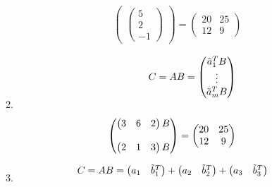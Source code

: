 \documentclass[12pt]{article}
\begin{document}
\begin{enumerate}
\begin{enumerate}
\begin{align*}
\begin{pmatrix}
\begin{pmatrix}
                    5 \\
                    2 \\
                    -1
                \end{pmatrix}
            \end{pmatrix}
            = \begin{pmatrix}
                20 & 25 \\
                12 & 9
            \end{pmatrix}
        \end{align*}
        \item 
        \begin{align*}
            C = AB = \begin{pmatrix}
                \Tilde{a}_1^T B \\
                \vdots \\
                \Tilde{a}_m^T B
            \end{pmatrix} && \\ && \\
            \begin{pmatrix}
                \begin{pmatrix}
                    3 & 6 & 2
                \end{pmatrix}
                B \\ \\
                \begin{pmatrix}
                    2 & 1 & 3
                \end{pmatrix}
                B
            \end{pmatrix}
            = \begin{pmatrix}
                20 & 25 \\
                12 & 9 
            \end{pmatrix}
        \end{align*}
        \item 
        \begin{align*}
            C = AB = \begin{pmatrix}
                a_1 & \Tilde{b}_1^T 
            \end{pmatrix}
            + \begin{pmatrix}
                a_2 & \Tilde{b}_2^T
            \end{pmatrix}
            + \begin{pmatrix}
                a_3 & \Tilde{b}_3^T
            \end{pmatrix} && \\ && \\

\end{align*}
\end{enumerate}
\end{enumerate}
\end{document}
